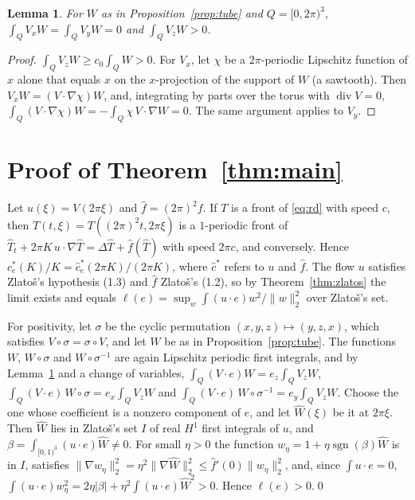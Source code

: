 \documentclass[11pt]{article}
\newtheorem{lemma}[theorem]{Lemma}
\theoremstyle{definition}
\theoremstyle{remark}
\begin{document}
\begin{lemma}\label{lem:avg}
For $W$ as in Proposition~\ref{prop:tube} and $Q=[0,2\pi)^3$,
$\int_QV_xW=\int_QV_yW=0$ and $\int_QV_zW>0$.
\end{lemma}

\begin{proof}
$\int_QV_zW\ge c_0\int_QW>0$. For $V_x$, let $\chi$ be a $2\pi$-periodic
Lipschitz function of $x$ alone that equals $x$ on the $x$-projection of the
support of $W$ (a sawtooth). Then $V_xW=(V\cdot\nabla\chi)W$, and, integrating
by parts over the torus with $\operatorname{div}V=0$,
$\int_Q(V\cdot\nabla\chi)W=-\int_Q\chi\,V\cdot\nabla W=0$. The same argument
applies to $V_y$.
\end{proof}

\section{Proof of Theorem~\ref{thm:main}}\label{sec:proof}
Let $u(\xi)=V(2\pi\xi)$ and $\hat f=(2\pi)^2f$. If $T$ is a front of
\eqref{eq:rd} with speed $c$, then $\hat T(t,\xi)=T((2\pi)^2t,2\pi\xi)$ is a
$1$-periodic front of $\hat T_t+2\pi K\,u\cdot\nabla\hat T=\Delta\hat T+\hat f(\hat T)$
with speed $2\pi c$, and conversely. Hence
$c^*_e(K)/K=\hat c^*_e(2\pi K)/(2\pi K)$, where $\hat c^*$ refers to $u$ and
$\hat f$. The flow $u$ satisfies Zlatoš's hypothesis (1.3) and $\hat f$ Zlatoš's
(1.2), so by Theorem~\ref{thm:zlatos} the limit exists and equals
$\ell(e)=\sup_w\int(u\cdot e)w^2/\|w\|_2^2$ over Zlatoš's set.

For positivity, let $\sigma$ be the cyclic permutation
$(x,y,z)\mapsto(y,z,x)$, which satisfies $V\circ\sigma=\sigma\circ V$, and let
$W$ be as in Proposition~\ref{prop:tube}. The functions $W$, $W\circ\sigma$
and $W\circ\sigma^{-1}$ are again Lipschitz periodic first integrals, and by
Lemma~\ref{lem:avg} and a change of variables,
$\int_Q(V\cdot e)W=e_z\int_QV_zW$,
$\int_Q(V\cdot e)\,W\circ\sigma=e_x\int_QV_zW$ and
$\int_Q(V\cdot e)\,W\circ\sigma^{-1}=e_y\int_QV_zW$. Choose the one whose
coefficient is a nonzero component of $e$, and let $\hat W(\xi)$ be it at
$2\pi\xi$. Then $\hat W$ lies in Zlatoš's set $I$ of real $H^1$ first
integrals of $u$, and $\beta=\int_{[0,1)^3}(u\cdot e)\hat W\ne0$. For small
$\eta>0$ the function $w_\eta=1+\eta\operatorname{sgn}(\beta)\hat W$ is in $I$,
satisfies $\|\nabla w_\eta\|_2^2=\eta^2\|\nabla\hat W\|_2^2\le\hat f'(0)\|w_\eta\|_2^2$,
and, since $\int u\cdot e=0$,
$\int(u\cdot e)w_\eta^2=2\eta|\beta|+\eta^2\int(u\cdot e)\hat W^2>0$. Hence
$\ell(e)>0$.\qed
\end{document}
